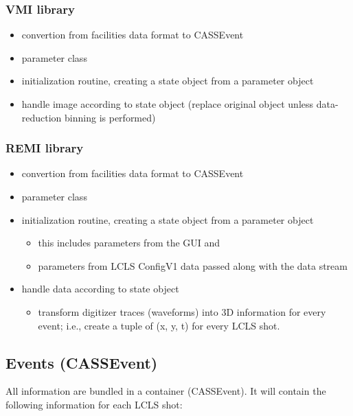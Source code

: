 \documentclass[11pt,a4paper,oneside]{article}
\begin{document}
\subsubsection{VMI library}
\label{sec:vmi-library}

\begin{itemize}
\item convertion from facilities data format to CASSEvent
\item parameter class
\item initialization routine, creating a state object from a parameter object
\item handle image according to state object (replace original object unless data-reduction binning is performed)
\end{itemize}


\subsubsection{REMI library}
\label{sec:remi-library}

\begin{itemize}
\item convertion from facilities data format to CASSEvent
\item parameter class
\item initialization routine, creating a state object from a parameter object
   \begin{itemize}
   \item this includes parameters from the GUI and
   \item parameters from LCLS ConfigV1 data passed along with the data stream
   \end{itemize}
\item handle data according to state object
   \begin{itemize}
   \item transform digitizer traces (waveforms) into 3D information for every event; i.e., create a
      tuple of (x, y, t) for every LCLS shot.
   \end{itemize}
\end{itemize}




\subsection{Events (CASSEvent)}
\label{sec:events}

All information are bundled in a container (CASSEvent). It will contain the following information for each LCLS shot:
\end{document}
